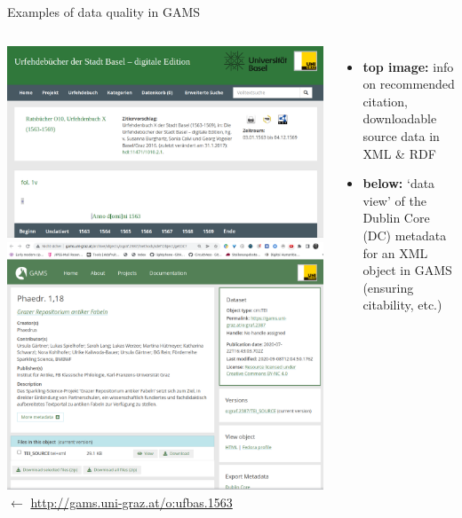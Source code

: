 
\begin{frame}[allowframebreaks]{Examples of data quality in GAMS}   
    \begin{columns}
    \includegraphics[width=\textwidth]{img/ufbas1.png}
    \includegraphics[width=\textwidth]{img/gams-graf-dc-metadata.png}
    \small
     $\leftarrow$ {\footnotesize \protect\url{http://gams.uni-graz.at/o:ufbas.1563}}
    \bigskip
    
    \begin{itemize}
        \item \textbf{top image:} info on recommended citation, downloadable source data in XML \& RDF
        \item \textbf{below:} `data view' of the Dublin Core (DC) metadata for an XML object in GAMS (ensuring citability, etc.)
    \end{itemize}
    \bigskip 
    

\end{columns}
\end{frame}
